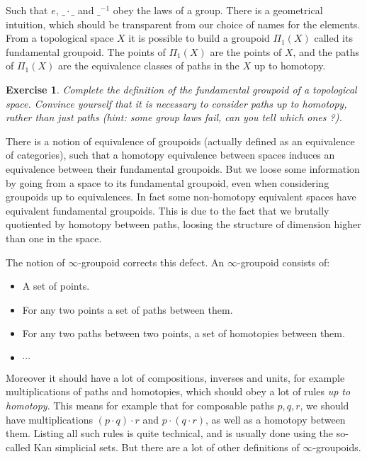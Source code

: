 \documentclass{article}
\newtheorem{exercise}{Exercise}
\begin{document}
Such that $e$, $\_\cdot\_$ and $\_^{-1}$ obey the laws of a group. There is a geometrical intuition, which should be transparent from our choice of names for the elements. %
From a topological space $X$ it is possible to build a groupoid $\Pi_1(X)$ called its fundamental groupoid. The points of $\Pi_1(X)$ are the points of $X$, and the paths of $\Pi_1(X)$ are the equivalence classes of paths in the $X$ up to homotopy.

\begin{exercise}
Complete the definition of the fundamental groupoid of a topological space. Convince yourself that it is necessary to consider paths up to homotopy, rather than just paths (hint: some group laws fail, can you tell which ones ?).
\end{exercise}

There is a notion of equivalence of groupoids (actually defined as an equivalence of categories), such that a homotopy equivalence between spaces induces an equivalence between their fundamental groupoids. But we loose some information by going from a space to its fundamental groupoid, even when considering groupoids up to equivalences. In fact some non-homotopy equivalent spaces have equivalent fundamental groupoids. This is due to the fact that we brutally quotiented by homotopy between paths, loosing the structure of dimension higher than one in the space.%

The notion of $\infty$-groupoid corrects this defect. An $\infty$-groupoid consists of:
\begin{itemize}
\item A set of points.
\item For any two points a set of paths between them.
\item For any two paths between two points, a set of homotopies between them.
\item $\cdots$
\end{itemize}
Moreover it should have a lot of compositions, inverses and units, for example multiplications of paths and homotopies, which should obey a lot of rules \emph{up to homotopy}. This means for example that for composable paths $p,q,r$, we should have multiplications $(p\cdot q)\cdot r$ and $p\cdot(q\cdot r)$, as well as a homotopy between them. Listing all such rules is quite technical, and is usually done using the so-called Kan simplicial sets. But there are a lot of other definitions of $\infty$-groupoids.
\end{document}
